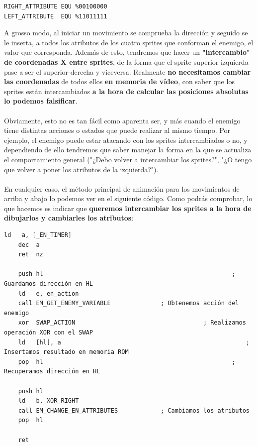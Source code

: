 \begin{lstlisting}[caption={Atributos de Sprites}, label={code:attributes}]
RIGHT_ATTRIBUTE EQU %00100000
LEFT_ATTRIBUTE  EQU %11011111
\end{lstlisting}

A grosso modo, al iniciar un movimiento se comprueba la dirección y seguido se le inserta, a todos los atributos de los cuatro sprites que conforman el enemigo, el valor que corresponda. Además de esto, tendremos que hacer un \textbf{"intercambio" de coordenadas X entre sprites}, de la forma que el sprite superior-izquierda pase a ser el superior-derecha y viceversa. Realmente \textbf{no necesitamos cambiar las coordenadas} de todos ellos \textbf{en memoria de vídeo}, con saber que los sprites están intercambiados \textbf{a la hora de calcular las posiciones absolutas lo podemos falsificar}.
\\ \\
Obviamente, esto no es tan fácil como aparenta ser, y más cuando el enemigo tiene distintas acciones o estados que puede realizar al mismo tiempo. Por ejemplo, el enemigo puede estar atacando con los sprites intercambiados o no, y dependiendo de ello tendremos que saber manejar la forma en la que se actualiza el comportamiento general ("¿Debo volver a intercambiar los sprites?", "¿O tengo que volver a poner los atributos de la izquierda?").
\\ \\
En cualquier caso, el método principal de animación para los movimientos de arriba y abajo lo podemos ver en el siguiente código. Como podrás comprobar, lo que hacemos es indicar que \textbf{queremos intercambiar los sprites a la hora de dibujarlos y cambiarles los atributos}:

\begin{lstlisting}[caption={Atributos de Sprites}, label={code:attributes}]
	ld 	 a, [_EN_TIMER]
	dec  a
	ret  nz

	push hl 													; Guardamos dirección en HL
	ld 	 e, en_action 
	call EM_GET_ENEMY_VARIABLE 				; Obtenemos acción del enemigo
	xor  SWAP_ACTION 									; Realizamos operación XOR con el SWAP
	ld 	 [hl], a 													; Insertamos resultado en memoria ROM
	pop  hl 													; Recuperamos dirección en HL

	push hl
	ld 	 b, XOR_RIGHT
	call EM_CHANGE_EN_ATTRIBUTES 			; Cambiamos los atributos
	pop  hl

	ret
\end{lstlisting}

